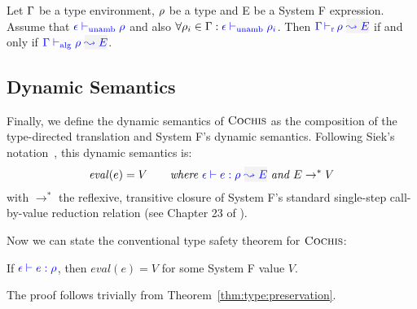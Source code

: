 % 

\begin{theorem}
Let $\Gamma$ be a type environment, $\rho$ be a type and E be a System F expression.
Assume that ${\color{blue} \epsilon \vdash_{\mathrm{unamb}} \rho}$ and also $\forall \rho_i \in \Gamma: {\color{blue} \epsilon \vdash_{\mathrm{unamb}} \rho_i}$.
Then $\dres{\tenv}{\rulet}{E}$ if and only if $\adres{\tenv}{\rulet}{E}$.
\end{theorem}

\subsection{Dynamic Semantics}
Finally, we define the dynamic semantics of $\textsc{Cochis}$ as the composition of
the type-directed translation and System F's dynamic semantics.  Following
Siek's notation~\cite{systemfg}, this dynamic semantics is:
\[ \mathit{eval}(e) = V \quad\quad \textit{where } \wte{\epsilon}{e}{\rulet}{E} \textit{ and } E \rightarrow^* V  \]
with $\rightarrow^*$ the reflexive, transitive closure of System F's standard single-step call-by-value reduction relation (see Chapter 23 of \cite{tapl}).

Now we can state the conventional type safety theorem for $\textsc{Cochis}$:
\begin{theorem}
If ${\color{blue} \epsilon \vdash e:\rho}$, then $\mathit{eval}(e) = V$ for
some System F value $V$.
\end{theorem}
The proof follows trivially from Theorem~\ref{thm:type:preservation}.



